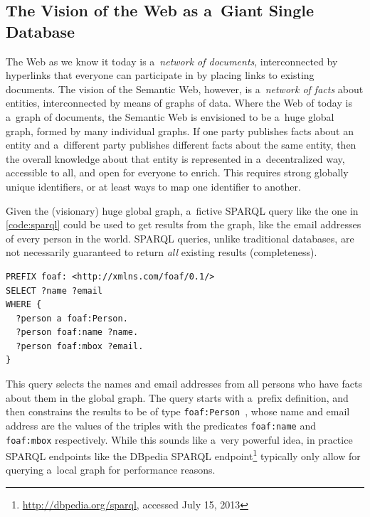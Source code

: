 \subsection{The Vision of the Web as a~Giant Single Database}

The Web as we know it today is a~\emph{network of documents},
interconnected by hyperlinks that everyone can participate in
by placing links to existing documents.
The vision of the Semantic Web, however,
is a~\emph{network of facts} about entities,
interconnected by means of graphs of data.
Where the Web of today is a~graph of documents,
the Semantic Web is envisioned to be a~huge global graph,
formed by many individual graphs.
If one party publishes facts about an entity
and a~different party publishes different facts
about the same entity,
then the overall knowledge about that entity
is represented in a~decentralized way,
accessible to all, and open for everyone to enrich.
This requires strong globally unique identifiers,
or at least ways to map one identifier to another.

Given the (visionary) huge global graph, a~fictive
SPARQL query like the one in \autoref{code:sparql}
could be used to get results from the graph,
like the email addresses of every person in the world.
SPARQL queries, unlike traditional databases, are not necessarily
guaranteed to return \emph{all} existing results (completeness).

\begin{lstlisting}[caption={[Fictive SPARQL query returning names and
  email addresses]
  {Fictive SPARQL query returning the names and email addresses of every
  person in the world
  (\url{http://en.wikipedia.org/wiki/SPARQL\#Benefits}, accessed July 15, 2013)}},
  label={code:sparql}]
PREFIX foaf: <http://xmlns.com/foaf/0.1/>
SELECT ?name ?email
WHERE {
  ?person a foaf:Person.
  ?person foaf:name ?name.
  ?person foaf:mbox ?email.
}
\end{lstlisting}

This query selects the names and email addresses from all persons
who have facts about them in the global graph.
The query starts with a~prefix definition,
and then constrains the results
to be of type \texttt{foaf:Person}~\cite{brickley2010foaf},
whose name and email address are the values
of the triples with the predicates \texttt{foaf:name}
and \texttt{foaf:mbox} respectively.
While this sounds like a~very powerful idea,
in practice SPARQL endpoints
like the DBpedia SPARQL
endpoint\footnote{\url{http://dbpedia.org/sparql}, accessed July 15, 2013}
typically only allow for querying a~local graph
for performance reasons.

